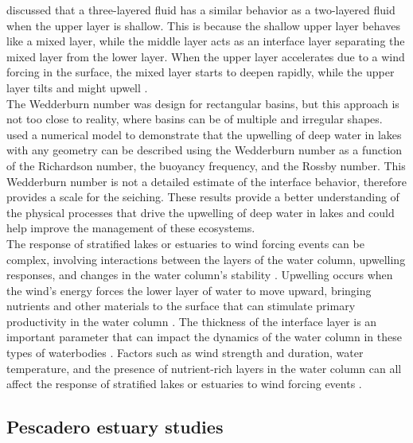 \documentclass[tesis.tex]{subfiles}
\begin{document}
\cite{Monismith1985} discussed that a three-layered fluid has a similar behavior as a two-layered fluid when the upper layer is shallow. This is because the shallow upper layer behaves like a mixed layer, while the middle layer acts as an interface layer separating the mixed layer from the lower layer. When the upper layer accelerates due to a wind forcing in the surface, the mixed layer starts to deepen rapidly, while the upper layer tilts and might upwell \citep{monismith2006vertical}.\\

The Wedderburn number was design for rectangular basins, but this approach is not too close to reality, where basins can be of multiple and irregular shapes. \cite{Shintani2010} used a numerical model to demonstrate that the upwelling of deep water in lakes with any geometry can be described using the Wedderburn number as a function of the Richardson number, the buoyancy frequency, and the Rossby number. This Wedderburn number is not a detailed estimate of the interface behavior, therefore provides a scale for the seiching. These results provide a better understanding of the physical processes that drive the upwelling of deep water in lakes and could help improve the management of these ecosystems.\\

The response of stratified lakes or estuaries to wind forcing events can be complex, involving interactions between the layers of the water column, upwelling responses, and changes in the water column's stability \citep{jayaweera2019turbulent}. Upwelling occurs when the wind's energy forces the lower layer of water to move upward, bringing nutrients and other materials to the surface that can stimulate primary productivity in the water column \citep{bastidas2021comparison}. The thickness of the interface layer is an important parameter that can impact the dynamics of the water column in these types of waterbodies \citep{xu2017vertical}. Factors such as wind strength and duration, water temperature, and the presence of nutrient-rich layers in the water column can all affect the response of stratified lakes or estuaries to wind forcing events \citep{nidheesh2018stratification}.\\

\subsection{Pescadero estuary studies}
\end{document}
